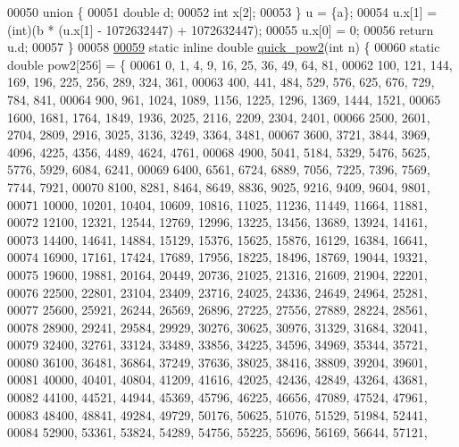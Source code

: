 \begin{DoxyCode}
00050   \textcolor{keyword}{union }\{
00051     \textcolor{keywordtype}{double} d;
00052     \textcolor{keywordtype}{int} x[2];
00053   \} u = \{a\};
00054   u.x[1] = (int)(b * (u.x[1] - 1072632447) + 1072632447);
00055   u.x[0] = 0;
00056   \textcolor{keywordflow}{return} u.d;
00057 \}
00058 
\hypertarget{_common_operations_8h_source_l00059}{}\hyperlink{namespace_soil_math_a69d186af0e164a5f98c42985aabec919}{00059} \textcolor{keyword}{static} \textcolor{keyword}{inline} \textcolor{keywordtype}{double} \hyperlink{namespace_soil_math_a69d186af0e164a5f98c42985aabec919}{quick\_pow2}(\textcolor{keywordtype}{int} n) \{
00060   \textcolor{keyword}{static} \textcolor{keywordtype}{double} pow2[256] = \{
00061       0,     1,     4,     9,     16,    25,    36,    49,    64,    81,
00062       100,   121,   144,   169,   196,   225,   256,   289,   324,   361,
00063       400,   441,   484,   529,   576,   625,   676,   729,   784,   841,
00064       900,   961,   1024,  1089,  1156,  1225,  1296,  1369,  1444,  1521,
00065       1600,  1681,  1764,  1849,  1936,  2025,  2116,  2209,  2304,  2401,
00066       2500,  2601,  2704,  2809,  2916,  3025,  3136,  3249,  3364,  3481,
00067       3600,  3721,  3844,  3969,  4096,  4225,  4356,  4489,  4624,  4761,
00068       4900,  5041,  5184,  5329,  5476,  5625,  5776,  5929,  6084,  6241,
00069       6400,  6561,  6724,  6889,  7056,  7225,  7396,  7569,  7744,  7921,
00070       8100,  8281,  8464,  8649,  8836,  9025,  9216,  9409,  9604,  9801,
00071       10000, 10201, 10404, 10609, 10816, 11025, 11236, 11449, 11664, 11881,
00072       12100, 12321, 12544, 12769, 12996, 13225, 13456, 13689, 13924, 14161,
00073       14400, 14641, 14884, 15129, 15376, 15625, 15876, 16129, 16384, 16641,
00074       16900, 17161, 17424, 17689, 17956, 18225, 18496, 18769, 19044, 19321,
00075       19600, 19881, 20164, 20449, 20736, 21025, 21316, 21609, 21904, 22201,
00076       22500, 22801, 23104, 23409, 23716, 24025, 24336, 24649, 24964, 25281,
00077       25600, 25921, 26244, 26569, 26896, 27225, 27556, 27889, 28224, 28561,
00078       28900, 29241, 29584, 29929, 30276, 30625, 30976, 31329, 31684, 32041,
00079       32400, 32761, 33124, 33489, 33856, 34225, 34596, 34969, 35344, 35721,
00080       36100, 36481, 36864, 37249, 37636, 38025, 38416, 38809, 39204, 39601,
00081       40000, 40401, 40804, 41209, 41616, 42025, 42436, 42849, 43264, 43681,
00082       44100, 44521, 44944, 45369, 45796, 46225, 46656, 47089, 47524, 47961,
00083       48400, 48841, 49284, 49729, 50176, 50625, 51076, 51529, 51984, 52441,
00084       52900, 53361, 53824, 54289, 54756, 55225, 55696, 56169, 56644, 57121,

\end{DoxyCode}
